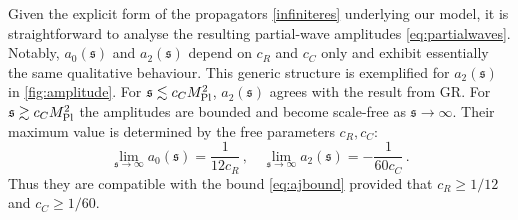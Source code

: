 \documentclass[aps,prl,reprint,twocolumn,superscriptaddress,longbibliography,nofootinbib,floatfix,showpacs]{revtex4-1}
\newcommand{\GR}{{\small GR}}
\newcommand{\be}{\begin{equation}}
\newcommand{\ee}{\end{equation}}
\newcommand{\mans}{\ensuremath{\mathfrak{s}}}
\newcommand{\modelname}{model}
\begin{document}
Given the explicit form of the propagators \eqref{infiniteres} underlying our \modelname{}, it is straightforward to analyse the resulting partial-wave amplitudes \eqref{eq:partialwaves}.
Notably, $a_0(\mans)$ and $a_2(\mans)$ depend on $c_R$ and $c_C$ only and exhibit essentially the same qualitative behaviour.
This generic structure is exemplified for $a_2(\mans)$ in \autoref{fig:amplitude}. 
 For $\mans \lesssim c_C M_{\rm Pl}^2$, $a_2(\mans)$ agrees with the result from \GR{}.
 For $\mans \gtrsim  c_C M_{\rm Pl}^2$ the amplitudes are bounded and become scale-free as $\mans \to \infty$.
 Their maximum value is determined by the free parameters $c_R, c_C$:
 \be
 \lim_{\mans \rightarrow \infty} a_0(\mans) = \frac{1}{12c_R} \, , \quad 
 \lim_{\mans \rightarrow \infty} a_2(\mans) = - \frac{1}{60c_C}  \, . 
 \ee
Thus they are compatible with the bound \eqref{eq:ajbound} provided that $c_R \ge 1/12$ and $c_C \ge 1/60$. 
 
\end{document}
